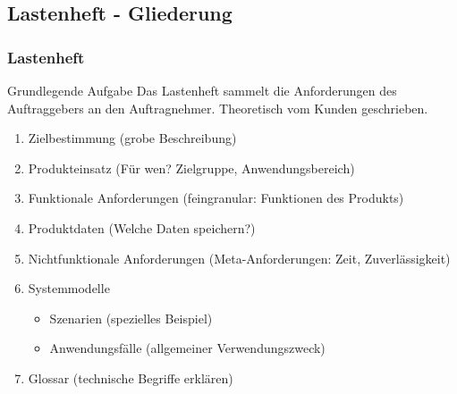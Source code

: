 \documentclass[18pt]{beamer}
\begin{document}
	\subsection{Lastenheft - Gliederung}
	\begin{frame}
		\frametitle{Lastenheft}
		\begin{block}{Grundlegende Aufgabe}
			Das Lastenheft sammelt die Anforderungen des Auftraggebers an den Auftragnehmer. Theoretisch vom Kunden geschrieben.
		\end{block}
		\begin{enumerate}
			\item \pause Zielbestimmung (grobe Beschreibung) \pause 
			\item Produkteinsatz (Für wen? Zielgruppe, Anwendungsbereich)\pause
			\item Funktionale Anforderungen (feingranular: Funktionen des Produkts)\pause 
			\item Produktdaten (Welche Daten speichern?)\pause
			\item Nichtfunktionale Anforderungen (Meta-Anforderungen: Zeit, Zuverlässigkeit)\pause 
			\item Systemmodelle
			\begin{itemize}
				\item Szenarien (spezielles Beispiel)
				\item Anwendungsfälle (allgemeiner Verwendungszweck)
			\end{itemize}
			\pause
			\item Glossar (technische Begriffe erklären)
		\end{enumerate}
	\end{frame}
	
\end{document}
